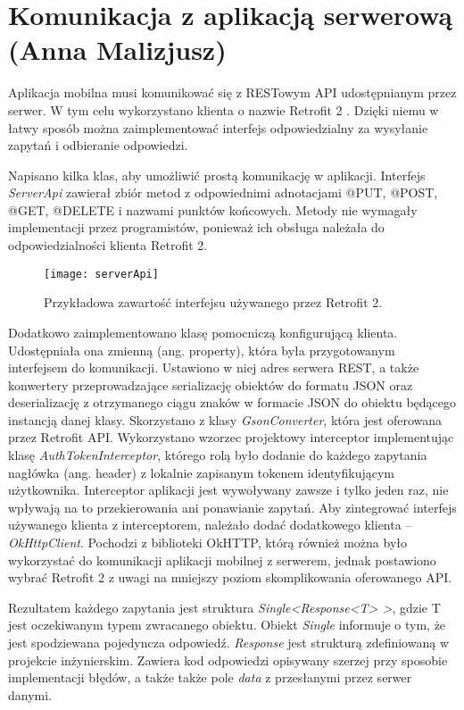 \section{Komunikacja z aplikacją serwerową (Anna Malizjusz)}
\par Aplikacja mobilna musi komunikować się z RESTowym API udostępnianym przez serwer. W tym celu wykorzystano klienta o nazwie Retrofit 2 \cite{Retrofit library}. Dzięki niemu w łatwy sposób można zaimplementować interfejs odpowiedzialny za wysyłanie zapytań i odbieranie odpowiedzi.

\par Napisano kilka klas, aby umożliwić prostą komunikację w aplikacji. Interfejs \textit{ServerApi} zawierał zbiór metod z odpowiednimi adnotacjami @PUT, @POST, @GET, @DELETE i nazwami punktów końcowych. Metody nie wymagały implementacji przez programistów, ponieważ ich obsługa należała do odpowiedzialności klienta Retrofit 2.

\begin{figure}[h]
\centering
\texttt{[image: serverApi]}
\caption{Przykładowa zawartość interfejsu używanego przez Retrofit 2.}
\label{fig:tokenPayload}
\end{figure}
\FloatBarrier

\par Dodatkowo zaimplementowano klasę pomocniczą konfigurującą klienta. Udostępniała ona zmienną (ang. property), która była przygotowanym interfejsem do komunikacji. Ustawiono w niej adres serwera REST, a także konwertery przeprowadzające serializację obiektów do formatu JSON oraz deserializację z otrzymanego ciągu znaków w formacie JSON do obiektu będącego instancją danej klasy. Skorzystano z klasy \textit{GsonConverter}, która jest oferowana przez Retrofit API. Wykorzystano wzorzec projektowy interceptor implementując klasę \textit{AuthTokenInterceptor}, którego rolą było dodanie do każdego zapytania nagłówka (ang. header) z lokalnie zapisanym tokenem identyfikującym użytkownika. Interceptor aplikacji jest wywoływany zawsze i tylko jeden raz, nie wpływają na to przekierowania ani ponawianie zapytań. Aby zintegrować interfejs używanego klienta z interceptorem, należało dodać dodatkowego klienta -- \textit{OkHttpClient}\cite{OkHttpClient}. Pochodzi z biblioteki OkHTTP, którą również można było wykorzystać do komunikacji aplikacji mobilnej z serwerem, jednak postawiono wybrać Retrofit 2 z uwagi na mniejszy poziom skomplikowania oferowanego API.

\par Rezultatem każdego zapytania jest struktura \textit{Single<Response<T> >}, gdzie T jest oczekiwanym typem zwracanego obiektu. Obiekt \textit{Single} informuje o tym, że jest spodziewana pojedyncza odpowiedź. \textit{Response} jest strukturą zdefiniowaną w projekcie inżynierskim. Zawiera kod odpowiedzi opisywany szerzej przy sposobie implementacji błędów, a także także pole \textit{data} z przesłanymi przez serwer danymi.


